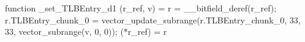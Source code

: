 function _set_TLBEntry_d1 (r_ref, v) = {
    r = __bitfield_deref(r_ref);
    r.TLBEntry_chunk_0 = vector_update_subrange(r.TLBEntry_chunk_0, 33, 33, vector_subrange(v, 0, 0));
    (*r_ref) = r
}
